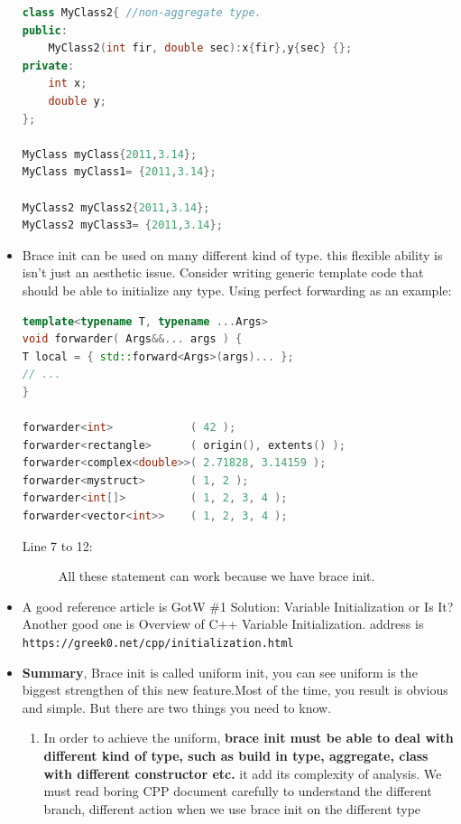 \documentclass[a4paper,11pt,twoside]{book}
\begin{document}
\begin{itemize}
\begin{lstlisting}[frame=single, language=c++,mathescape=true]
class MyClass2{ //non-aggregate type.
public:
	MyClass2(int fir, double sec):x{fir},y{sec} {};
private: 
	int x;
	double y;
};
	
MyClass myClass{2011,3.14};      
MyClass myClass1= {2011,3.14};    
	
MyClass2 myClass2{2011,3.14};     
MyClass2 myClass3= {2011,3.14};   
\end{lstlisting}

\item Brace init can be used on many different kind of type. this flexible ability is isn't just an aesthetic issue. Consider writing generic template code that should be able to initialize any type. Using perfect forwarding as an example:

\begin{lstlisting}[frame=single, language=c++,mathescape=true]
template<typename T, typename ...Args>
void forwarder( Args&&... args ) {
T local = { std::forward<Args>(args)... };
// ...
}

forwarder<int>            ( 42 );                  
forwarder<rectangle>      ( origin(), extents() ); 
forwarder<complex<double>>( 2.71828, 3.14159 );    
forwarder<mystruct>       ( 1, 2 );                
forwarder<int[]>          ( 1, 2, 3, 4 );          
forwarder<vector<int>>    ( 1, 2, 3, 4 );          
\end{lstlisting}
\begin{description}
	\item[Line 7 to 12:] All these statement can work because we have brace init. 
\end{description}


	\item A good reference article is GotW \#1 Solution: Variable Initialization or Is It? Another good one is Overview of C++ Variable Initialization. address is \\ \verb=https://greek0.net/cpp/initialization.html=
	
	\item \textbf{Summary}, Brace init is called uniform init, you can see uniform is the biggest strengthen of this new feature.Most of the time, you result is obvious and simple. But there are two things you need to know.
	\begin{enumerate}
		\item In order to achieve the uniform, \textbf{brace init must be able to deal with different kind of type, such as build in type, aggregate, class with different constructor etc.} it add its complexity of analysis. We must read boring CPP document carefully to understand the different branch, different action when we use brace init on the different type 
		

\end{enumerate}
\end{itemize}
\end{document}
